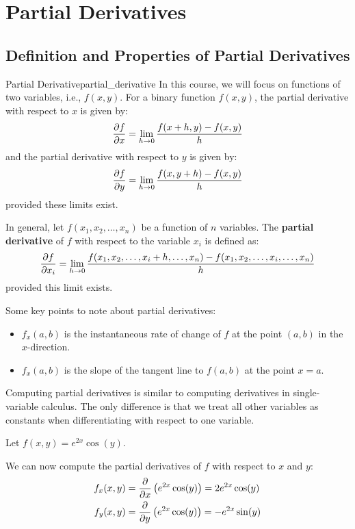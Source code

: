\section{Partial Derivatives}

\subsection{Definition and Properties of Partial Derivatives}
\begin{definition}{Partial Derivative}{partial_derivative}
    In this course, we will focus on functions of two variables, i.e., $f(x, y)$.
    For a binary function $f(x, y)$, the partial derivative with respect to $x$ is given by:
    \[
        \pdv{f}{x} = \lim_{h \to 0} \frac{f(x + h, y) - f(x, y)}{h}
    \]
    and the partial derivative with respect to $y$ is given by:
    \[
        \pdv{f}{y} = \lim_{h \to 0} \frac{f(x, y + h) - f(x, y)}{h}
    \]
    provided these limits exist.
    
    In general, let $f(x_1, x_2, \ldots, x_n)$ be a function of $n$ variables. The \textbf{partial derivative} of $f$ with respect to the variable $x_i$ is defined as:
    \[
        \pdv{f}{x_i} = \lim_{h \to 0} \frac{f(x_1, x_2, \ldots, x_i + h, \ldots, x_n) - f(x_1, x_2, \ldots, x_i, \ldots, x_n)}{h}
    \]
    provided this limit exists.
\end{definition}

Some key points to note about partial derivatives:
\begin{itemize}
    \item $f_x(a, b)$ is the instantaneous rate of change of $f$ at the point $(a, b)$ in the $x$-direction.
    \item $f_x(a, b)$ is the slope of the tangent line to $f(a, b)$ at the point $x = a$.
\end{itemize}

Computing partial derivatives is similar to computing derivatives in single-variable calculus.
The only difference is that we treat all other variables as constants when differentiating with respect to one variable.

\begin{example}
Let $f(x, y) = e^{2x} \cos(y)$.

We can now compute the partial derivatives of $f$ with respect to $x$ and $y$:
\begin{align*}
    f_x(x, y) &= \pdv{}{x} \left( e^{2x} \cos(y) \right) = 2 e^{2x} \cos(y) \\
    f_y(x, y) &= \pdv{}{y} \left( e^{2x} \cos(y) \right) = -e^{2x} \sin(y)
\end{align*}
\end{example}

